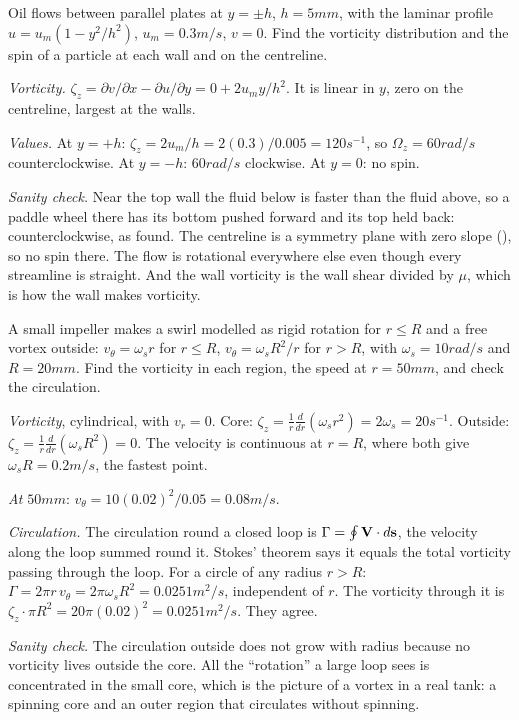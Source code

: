 \begin{example}
Oil flows between parallel plates at $y = \pm h$, $h = 5\unit{mm}$, with the laminar profile $u = u_m(1 - y^2/h^2)$, $u_m = 0.3\unit{m/s}$, $v = 0$. Find the vorticity distribution and the spin of a particle at each wall and on the centreline.

\emph{Vorticity.} $\zeta_z = \partial v/\partial x - \partial u/\partial y = 0 + 2u_m y/h^2$. It is linear in $y$, zero on the centreline, largest at the walls.

\emph{Values.} At $y = +h$: $\zeta_z = 2u_m/h = 2(0.3)/0.005 = 120\unit{s^{-1}}$, so $\Omega_z = 60\unit{rad/s}$ counterclockwise. At $y = -h$: $60\unit{rad/s}$ clockwise. At $y = 0$: no spin.

\emph{Sanity check.} Near the top wall the fluid below is faster than the fluid above, so a paddle wheel there has its bottom pushed forward and its top held back: counterclockwise, as found. The centreline is a symmetry plane with zero slope (), so no spin there. The flow is rotational everywhere else even though every streamline is straight. And the wall vorticity is the wall shear divided by $\mu$, which is how the wall makes vorticity.
\end{example}

\begin{example}
A small impeller makes a swirl modelled as rigid rotation for $r \le R$ and a free vortex outside: $v_\theta = \omega_s r$ for $r \le R$, $v_\theta = \omega_s R^2/r$ for $r > R$, with $\omega_s = 10\unit{rad/s}$ and $R = 20\unit{mm}$. Find the vorticity in each region, the speed at $r = 50\unit{mm}$, and check the circulation.

\emph{Vorticity}, cylindrical, with $v_r = 0$. Core: $\zeta_z = \frac{1}{r}\frac{d}{dr}(\omega_s r^2) = 2\omega_s = 20\unit{s^{-1}}$. Outside: $\zeta_z = \frac{1}{r}\frac{d}{dr}(\omega_s R^2) = 0$. The velocity is continuous at $r = R$, where both give $\omega_s R = 0.2\unit{m/s}$, the fastest point.

\emph{At $50\unit{mm}$}: $v_\theta = 10(0.02)^2/0.05 = 0.08\unit{m/s}$.

\emph{Circulation.} The circulation round a closed loop is $\Gamma = \oint \mathbf{V}\cdot d\mathbf{s}$, the velocity along the loop summed round it. Stokes' theorem says it equals the total vorticity passing through the loop. For a circle of any radius $r > R$: $\Gamma = 2\pi r\,v_\theta = 2\pi\omega_s R^2 = 0.0251\unit{m^2/s}$, independent of $r$. The vorticity through it is $\zeta_z\cdot\pi R^2 = 20\pi(0.02)^2 = 0.0251\unit{m^2/s}$. They agree.

\emph{Sanity check.} The circulation outside does not grow with radius because no vorticity lives outside the core. All the ``rotation'' a large loop sees is concentrated in the small core, which is the picture of a vortex in a real tank: a spinning core and an outer region that circulates without spinning.
\end{example}

